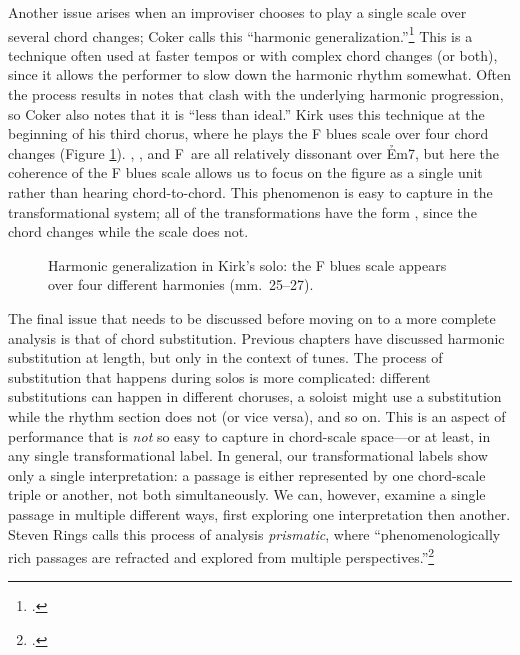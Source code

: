 Another issue arises when an improviser chooses to play a single scale over
several chord changes; Coker calls this ``harmonic
generalization.''\footcite[45--49]{coker:elements} This is a technique often
used at faster tempos or with complex chord changes (or both), since it allows
the performer to slow down the harmonic rhythm somewhat. Often the process
results in notes that clash with the underlying harmonic progression, so Coker
also notes that it is ``less than ideal.'' Kirk uses this technique
at the beginning of his third chorus, where he plays the F blues scale over
four chord changes (Figure \ref{csa:harmonic-generalization}).
\Bflat, \Aflat, and F\nat\ are all relatively dissonant over \h{Em7}, but here
the coherence of the F blues scale allows us to focus on the figure as a
single unit rather than hearing chord-to-chord. This phenomenon is easy to
capture in the transformational system; all of the transformations have the
form , since the chord changes while the scale does not.

\begin{figure}[tbp]
  \caption[Harmonic generalization in Kirk's solo.]{Harmonic generalization in
    Kirk's solo: the F blues scale appears over four different harmonies
    (mm.~25--27).}
  \label{csa:harmonic-generalization}
\end{figure}


The final issue that needs to be discussed before moving on to a more complete
analysis is that of chord substitution. Previous chapters have discussed
harmonic substitution at length, but only in the context of tunes. The process
of substitution that happens during solos is more complicated: different
substitutions can happen in different choruses, a soloist might use a
substitution while the rhythm section does not (or vice versa), and so on.
This is an aspect of performance that is \emph{not} so easy to capture in
chord-scale space---or at least, in any single transformational label. In
general, our transformational labels show only a single interpretation: a
passage is either represented by one chord-scale triple or another, not both
simultaneously. We can, however, examine a single passage in multiple
different ways, first exploring one interpretation then another. Steven Rings
calls this process of analysis \emph{prismatic}, where ``phenomenologically
rich passages are refracted and explored from multiple
perspectives.''\footcite[38]{rings:2011}

